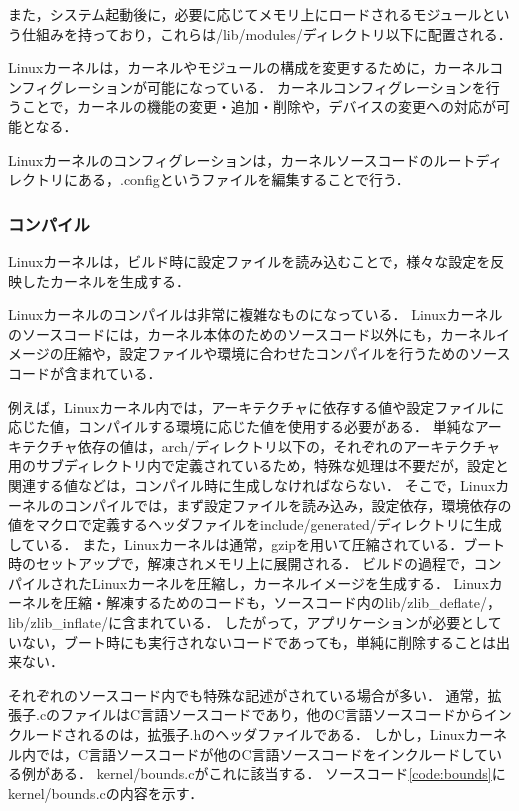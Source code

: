 \documentclass[graduation-thesis]{mlarticle}
\begin{document}
また，システム起動後に，必要に応じてメモリ上にロードされるモジュールという仕組みを持っており，これらは/lib/modules/ディレクトリ以下に配置される．

Linuxカーネルは，カーネルやモジュールの構成を変更するために，カーネルコンフィグレーションが可能になっている．
カーネルコンフィグレーションを行うことで，カーネルの機能の変更・追加・削除や，デバイスの変更への対応が可能となる．

Linuxカーネルのコンフィグレーションは，カーネルソースコードのルートディレクトリにある，.configというファイルを編集することで行う．

\subsubsection{コンパイル}
\label{propo:linux:compile}
Linuxカーネルは，ビルド時に設定ファイルを読み込むことで，様々な設定を反映したカーネルを生成する．


Linuxカーネルのコンパイルは非常に複雑なものになっている．
Linuxカーネルのソースコードには，カーネル本体のためのソースコード以外にも，カーネルイメージの圧縮や，設定ファイルや環境に合わせたコンパイルを行うためのソースコードが含まれている．

例えば，Linuxカーネル内では，アーキテクチャに依存する値や設定ファイルに応じた値，コンパイルする環境に応じた値を使用する必要がある．
単純なアーキテクチャ依存の値は，arch/ディレクトリ以下の，それぞれのアーキテクチャ用のサブディレクトリ内で定義されているため，特殊な処理は不要だが，設定と関連する値などは，コンパイル時に生成しなければならない．
そこで，Linuxカーネルのコンパイルでは，まず設定ファイルを読み込み，設定依存，環境依存の値をマクロで定義するヘッダファイルをinclude/generated/ディレクトリに生成している．
また，Linuxカーネルは通常，gzipを用いて圧縮されている．ブート時のセットアップで，解凍されメモリ上に展開される．
ビルドの過程で，コンパイルされたLinuxカーネルを圧縮し，カーネルイメージを生成する．
Linuxカーネルを圧縮・解凍するためのコードも，ソースコード内のlib/zlib\_deflate/，lib/zlib\_inflate/に含まれている．
したがって，アプリケーションが必要としていない，ブート時にも実行されないコードであっても，単純に削除することは出来ない．


それぞれのソースコード内でも特殊な記述がされている場合が多い．
通常，拡張子.cのファイルはC言語ソースコードであり，他のC言語ソースコードからインクルードされるのは，拡張子.hのヘッダファイルである．
しかし，Linuxカーネル内では，C言語ソースコードが他のC言語ソースコードをインクルードしている例がある．
kernel/bounds.cがこれに該当する．
ソースコード\ref{code:bounds}にkernel/bounds.cの内容を示す．
\end{document}
